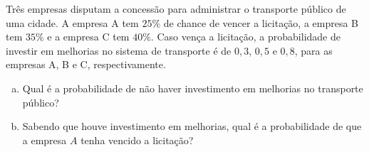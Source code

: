 %
%


\begin{exercicioBanco}[\valorquestao]
Três empresas disputam a concessão para administrar o transporte público de uma cidade. A empresa A tem \(25\%\) de chance de vencer a licitação, a empresa B tem \(35\%\) e a empresa C tem \(40\%\). Caso vença a licitação, a probabilidade de investir em melhorias no sistema de transporte é de \(0{,}3\), \(0{,}5\) e \(0{,}8\), para as empresas A, B e C, respectivamente.

\begin{enumerate}[(a)]
    \item Qual é a probabilidade de não haver investimento em melhorias no transporte público?
    \item Sabendo que houve investimento em melhorias, qual é a probabilidade de que a empresa \(A\) tenha vencido a licitação?
\end{enumerate}

\end{exercicioBanco}


